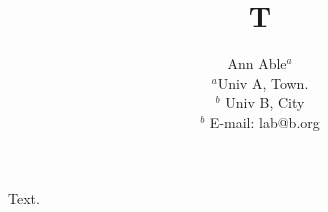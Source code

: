 \documentclass{article}
\title{T}
\author{Ann Able$^{a}$\\
{\small $^{a}$Univ A, Town.}\\
{\small $^{b}$ Univ B, City}\\
{\small $^{b}$ E-mail: lab@b.org}\\
}
\date{}
\begin{document}
\maketitle
Text.
\end{document}
